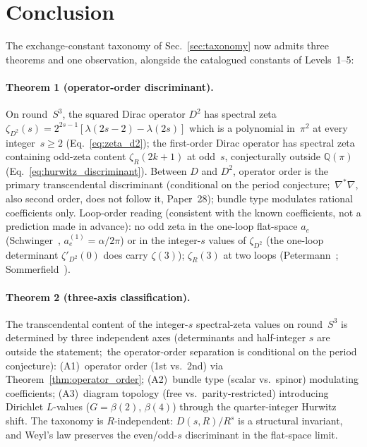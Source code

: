 \documentclass[aps,pra,twocolumn,superscriptaddress,longbibliography]{revtex4-2}
\begin{document}
\section{Conclusion}
\label{sec:conclusion}

The exchange-constant taxonomy of Sec.~\ref{sec:taxonomy} now
admits three theorems and one observation, alongside the
catalogued constants of Levels~1--5:

\paragraph{Theorem 1 (operator-order discriminant).}
On round~$S^3$, the squared Dirac operator $D^2$ has spectral zeta
$\zeta_{D^2}(s) = 2^{2s-1}[\lambda(2s{-}2) - \lambda(2s)]$ which is
a polynomial in~$\pi^2$ at every integer~$s \ge 2$
(Eq.~\ref{eq:zeta_d2}); the first-order Dirac operator has
spectral zeta containing odd-zeta content $\zeta_R(2k{+}1)$ at
odd~$s$, conjecturally outside $\mathbb{Q}(\pi)$
(Eq.~\ref{eq:hurwitz_discriminant}).  Between $D$ and $D^2$, operator
order is the primary transcendental discriminant (conditional on the
period conjecture;\ $\nabla^*\nabla$, also second order, does not
follow it, Paper~28);
bundle type modulates rational
coefficients only.  Loop-order reading (consistent with the known
coefficients, not a prediction made in advance): no odd zeta in the
one-loop flat-space $a_e$ (Schwinger~\cite{schwinger1948},
$a_e^{(1)} = \alpha/2\pi$) or in the integer-$s$ values of $\zeta_{D^2}$
(the one-loop determinant $\zeta'_{D^2}(0)$ does carry $\zeta(3)$);
$\zeta_R(3)$ at two loops (Petermann~\cite{petermann1957};
Sommerfield~\cite{sommerfield1957}).

\paragraph{Theorem 2 (three-axis classification).}
The transcendental content of the integer-$s$ spectral-zeta values on
round~$S^3$ is determined by three independent axes (determinants and
half-integer $s$ are outside the statement;\ the operator-order
separation is conditional on the period conjecture):
(A1)~operator order (1st vs.\ 2nd) via Theorem~\ref{thm:operator_order};
(A2)~bundle type (scalar vs.\ spinor) modulating coefficients;
(A3)~diagram topology (free vs.\ parity-restricted) introducing
Dirichlet $L$-values ($G = \beta(2)$, $\beta(4)$) through the
quarter-integer Hurwitz shift.  The taxonomy is $R$-independent:
$D(s,R)/R^s$ is a structural invariant, and Weyl's law preserves the
even/odd-$s$ discriminant in the flat-space limit.
\end{document}
